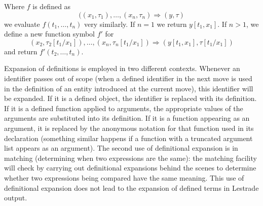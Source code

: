 \documentclass[12pt]{article}
\begin{document}
Where $f$ is defined as  $$((x_1,\tau_1),\ldots,(x_n,\tau_n) \Rightarrow (y,\tau)$$ we evaluate $f(t_1,\ldots,t_n)$ very similarly.  If $n=1$ we return $y[t_1,x_1]$.  If $n>1$, we define a new function symbol $f'$ for $$(x_2,\tau_2[t_1/x_1]),\ldots,(x_n,\tau_n[t_1/x_1]) \Rightarrow (y[t_1,x_1],\tau[t_1/x_1])$$ and return $f'(t_2,\ldots,t_n)$.

Expansion of definitions is employed in two different contexts.  Whenever an identifier passes out of scope (when a defined identifier in the next move is used in the definition of an entity introduced at the current move), this identifier will be expanded.  If it is a defined object, the identifier is replaced with its definition.
If it is a defined function applied to arguments, the appropriate values of the arguments are substituted into its definition.  If it is a function appearing as an argument, it is replaced by the anonymous notation for that function used in its declaration (something similar happens if a function with a truncated argument list appears as an argument).  The second use of definitional expansion is in matching (determining when two expressions are the same):  the matching facility will check by carrying out definitional expansions behind the scenes to determine whether two expressions being compared have the same meaning.  This use of definitional expansion does not lead to the expansion of defined terms in Lestrade output.
\end{document}
